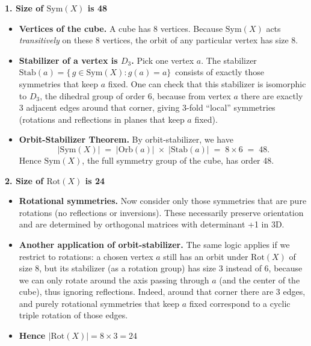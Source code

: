 \documentclass[12pt]{article}
\theoremstyle{definition} %
\theoremstyle{plain} %
\begin{document}
\bigskip

\noindent
\textbf{1. Size of $\mathrm{Sym}(X)$ is 48}

\begin{itemize}
    \item \textbf{Vertices of the cube.}
    A cube has 8 vertices. Because $\mathrm{Sym}(X)$ acts \emph{transitively} on these 8 vertices, the orbit of any particular vertex has size 8.

    \item \textbf{Stabilizer of a vertex is $D_3$.}
    Pick one vertex $a$. The stabilizer $\mathrm{Stab}(a) = \{\,g \in \mathrm{Sym}(X) : g(a) = a\}\,$ consists of exactly those symmetries that keep $a$ fixed.  One can check that this stabilizer is isomorphic to $D_3$, the dihedral group of order $6$, because from vertex $a$ there are exactly 3 adjacent edges around that corner, giving 3-fold “local” symmetries (rotations and reflections in planes that keep $a$ fixed).

    \item \textbf{Orbit-Stabilizer Theorem.}
    By orbit-stabilizer, we have
    \[
      |\mathrm{Sym}(X)| 
      \;=\; |\mathrm{Orb}(a)| \;\times\; |\mathrm{Stab}(a)| 
      \;=\; 8 \times 6 
      \;=\; 48.
    \]
    Hence $\mathrm{Sym}(X)$, the full symmetry group of the cube, has order 48.

\end{itemize}

\bigskip

\noindent
\textbf{2. Size of $\mathrm{Rot}(X)$ is 24}

\begin{itemize}
    \item \textbf{Rotational symmetries.}
    Now consider only those symmetries that are pure rotations (no reflections or inversions).  These necessarily preserve orientation and are determined by orthogonal matrices with determinant +1 in 3D.

    \item \textbf{Another application of orbit-stabilizer.}
    The same logic applies if we restrict to rotations: a chosen vertex $a$ still has an orbit under $\mathrm{Rot}(X)$ of size 8, but its stabilizer (as a rotation group) has size 3 instead of 6, because we can only rotate around the axis passing through $a$ (and the center of the cube), thus ignoring reflections.  Indeed, around that corner there are 3 edges, and purely rotational symmetries that keep $a$ fixed correspond to a cyclic triple rotation of those edges.

    \item \textbf{Hence $|\mathrm{Rot}(X)| = 8 \times 3 = 24$}

\end{itemize}
\end{document}
